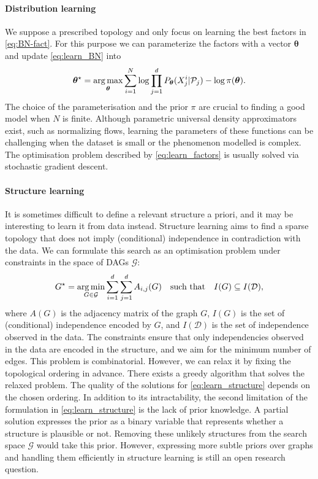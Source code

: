 \paragraph{Distribution learning}
We suppose a prescribed topology and only focus on learning the best factors in \eqref{eq:BN-fact}. For this purpose we can parameterize the factors with a vector $\bm \theta$ and update \eqref{eq:learn_BN} into
\begin{align}
  {\bm \theta}^\star  = \operatorname*{arg\,max}_{\bm \theta} \sum_{i=1}^N \log \prod^d_{j=1}P_{\bm \theta}(X_j^i|\mathcal{P}_j) - \log \pi(\bm \theta).
 \label{eq:learn_factors}
\end{align}
The choice of the parameterisation and the prior $\pi$ are crucial to finding a good model when $N$ is finite. Although parametric universal density approximators exist, such as normalizing flows, learning the parameters of these functions can be challenging when the dataset is small or the phenomenon modelled is complex. The optimisation problem described by \eqref{eq:learn_factors} is usually solved via stochastic gradient descent.

\paragraph{Structure learning}
It is sometimes difficult to define a relevant structure a priori, and it may be interesting to learn it from data instead. Structure learning aims to find a sparse topology that does not imply (conditional) independence in contradiction with the data. We can formulate this search as an optimisation problem under constraints in the space of DAGs $\mathcal{G}$:
\begin{align}
 G^\star = \operatorname*{arg\,min}_{G \in \mathcal{G}} \sum_{i=1}^d\sum_{j=1}^d A_{i,j}(G) \quad \text{such that} \quad I(G) \subseteq I(\mathcal{D}), \label{eq:learn_structure}
\end{align}
where $A(G)$ is the adjacency matrix of the graph $G$, $I(G)$ is the set of (conditional) independence encoded by $G$, and $I(\mathcal{D})$ is the set of independence observed in the data. The constraints ensure that only independencies observed in the data are encoded in the structure, and we aim for the minimum number of edges. This problem is combinatorial. However, we can relax it by fixing the topological ordering in advance. There exists a greedy algorithm that solves the relaxed problem. The quality of the solutions for \eqref{eq:learn_structure} depends on the chosen ordering. In addition to its intractability, the second limitation of the formulation in \eqref{eq:learn_structure} is the lack of prior knowledge. A partial solution expresses the prior as a binary variable that represents whether a structure is plausible or not. Removing these unlikely structures from the search space $\mathcal{G}$ would take this prior. However, expressing more subtle priors over graphs and handling them efficiently in structure learning is still an open research question.


